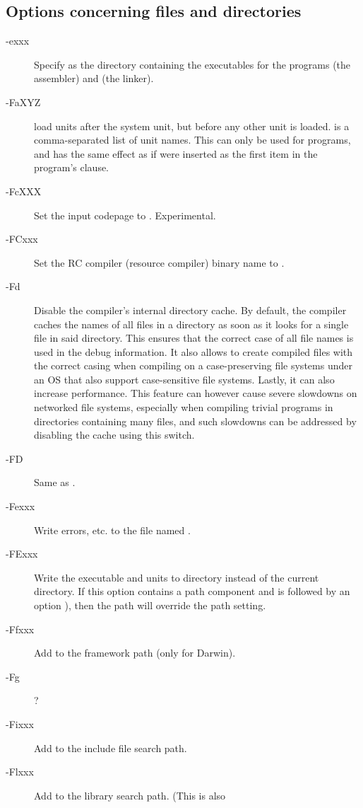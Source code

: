 \subsection{Options concerning files and directories}
\begin{description}
\item [-exxx] Specify  as the directory containing the
executables for the programs  (the assembler) and  (the linker).
\item[-FaXYZ] load units  after the system unit, but before any other
unit is loaded.  is a comma-separated list of unit names. This can only be used
for programs, and has the same effect as if  were inserted as the
first item in the program's  clause.
\item[-FcXXX] Set the input codepage to . Experimental.
\item[-FCxxx] Set the RC compiler (resource compiler) binary name to .
\item[-Fd] Disable the compiler's internal directory cache. By default, the compiler caches the
names of all files in a directory as soon as it looks for a single file in said directory. This ensures
that the correct case of all file names is used in the debug information.
It also allows to create compiled files with the correct casing when compiling on a case-preserving
file systems under an OS that also support case-sensitive file systems.
Lastly, it can also increase performance. This feature can however cause severe slowdowns
on networked file systems, especially when compiling trivial programs in directories containing many
files, and such slowdowns can be addressed by disabling the cache using this switch.
\item [-FD] Same as .
\item [-Fexxx] Write errors, etc. to the file named .
\item [-FExxx] Write the executable and units to directory 
instead of the current directory. If this option contains a path component
and is followed by an option ), then the  path will override
the  path setting.
\item [-Ffxxx] Add  to the framework path (only for Darwin).
\item [-Fg] ?
\item [-Fixxx] Add  to the include file search path.
\item [-Flxxx] Add  to the library search path. (This is also

\end{description}
